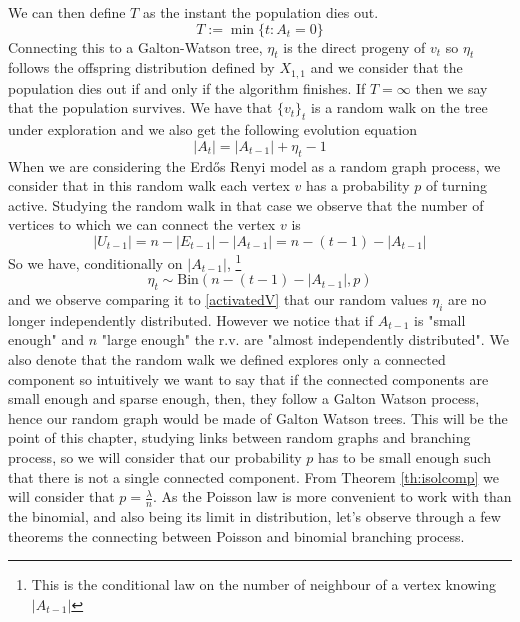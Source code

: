 We can then define $T$ as the instant the population dies out.
\begin{equation}\label{eq:defT}
	T := \min\{t: A_t = 0\}
\end{equation}
Connecting this to a Galton-Watson tree, $\eta_t$ is the direct progeny of $v_t$ so $\eta_t$ follows the offspring distribution defined by $X_{1, 1}$ and we consider that the population dies out if and only if the algorithm finishes.
If $T = \infty$ then we say that the population survives. 
\newline
We have that $\{v_t\}_t$ is a random walk on the tree under exploration and we also get the following evolution equation 
\begin{equation}\label{eq:St}
	|A_t| = |A_{t-1}| + \eta_t - 1
\end{equation}
\newline
When we are considering the Erd\H{o}s Renyi model as a random graph process, we consider that in this random walk each vertex $v$ has a probability $p$ of turning active. 
Studying the random walk in that case we observe that the number of vertices to which we can connect the vertex $v$ is
\begin{equation}
	|U_{t-1}| = n - |E_{t-1}| - |A_{t-1}| = n - (t-1) - |A_{t-1}|
\end{equation}
So we have, conditionally on $|A_{t-1}|$,
\footnote{This is the conditional law on the number of neighbour of a vertex knowing $|A_{t-1}|$}
\begin{equation}
	\eta_t \sim \text{Bin}( n - (t-1) - |A_{t-1}|, p)
\end{equation}
and we observe comparing it to \eqref{activatedV} that our random values $\eta_i$ are no longer independently distributed. 
However we notice that if $A_{t-1}$ is "small enough" and $n$ "large enough" the r.v. are "almost independently distributed".
We also denote that the random walk we defined explores only a connected component so intuitively we want to say that if the connected components are small enough and sparse enough, then, they follow a Galton Watson process, hence our random graph would be made of Galton Watson trees.
This will be the point of this chapter, studying links between random graphs and branching process, so we will consider that our probability $p$ has to be small enough such that there is not a single connected component. From Theorem \ref{th:isolcomp} we will consider that $p=\frac{\lambda}{n}$.
\newline
As the Poisson law is more convenient to work with than the binomial, and also being its limit in distribution, let's observe through a few theorems the connecting between Poisson and binomial branching process.
